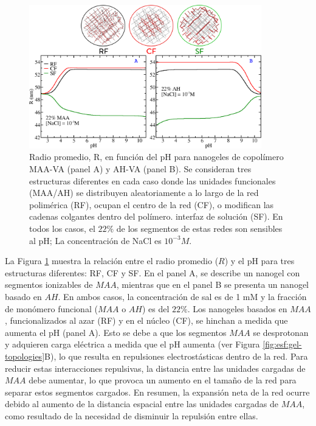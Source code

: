 \begin{figure}[!htb]
     \centering
     \includegraphics[width=0.9\textwidth]{Figures/graphs-gel2/rr.png}
     \caption{Radio promedio, R, en funci\'on del pH para nanogeles de copol\'imero MAA-VA (panel A) y AH-VA (panel B).
     	Se consideran tres estructuras diferentes en cada caso donde las unidades funcionales (MAA/AH) se distribuyen aleatoriamente a lo largo de la red polim\'erica (RF), ocupan el centro de la red (CF), o modifican las cadenas colgantes dentro del pol\'imero. interfaz de soluci\'on (SF).
     	En todos los casos, el $22\%$ de los segmentos de estas redes son sensibles al pH; La concentraci\'on de NaCl es $10^{-3}M$.}
     \label{fig:esf:gel-charge-MAA-AH}
\end{figure}


La Figura \ref{fig:esf:gel-charge-MAA-AH} muestra la relaci\'on entre el radio promedio ($R$) y el pH para tres estructuras diferentes: RF, CF y SF. En el panel A, se describe un nanogel con segmentos ionizables de $MAA$, mientras que en el panel B se presenta un nanogel basado en $AH$. En ambos casos, la concentraci\'on de sal es de 1 mM y la fracci\'on de mon\'omero funcional ($MAA$ o $AH$) es del $22\%$. Los nanogeles basados en $MAA$, funcionalizados al azar (RF) y en el n\'ucleo (CF), se hinchan a medida que aumenta el pH (panel A). Esto se debe a que los segmentos $MAA$ se desprotonan y adquieren carga el\'ectrica a medida que el pH aumenta (ver Figura \ref{fig:esf:gel-topologies}B), lo que resulta en repulsiones electrost\'asticas dentro de la red. Para reducir estas interacciones repulsivas, la distancia entre las unidades cargadas de $MAA$ debe aumentar, lo que provoca un aumento en el tama\~no de la red para separar estos segmentos cargados. En resumen, la expansi\'on neta de la red ocurre debido al aumento de la distancia espacial entre las unidades cargadas de $MAA$, como resultado de la necesidad de disminuir la repulsi\'on entre ellas.



